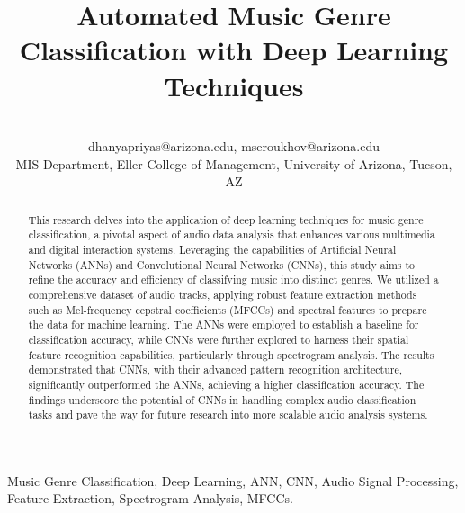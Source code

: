 \documentclass[lettersize,journal]{IEEEtran}
\begin{document}
\title{Automated Music Genre Classification with Deep Learning Techniques}
\author{~\\{\small \hspace{1.0cm} dhanyapriyas@arizona.edu,\hspace{1.5cm}
mseroukhov@arizona.edu}\\MIS Department, Eller College of Management, University of Arizona, Tucson, AZ}
\maketitle
\begin{abstract}
This research delves into the application of deep learning techniques for music genre classification, a pivotal aspect of audio data analysis that enhances various multimedia and digital interaction systems. Leveraging the capabilities of Artificial Neural Networks (ANNs) and Convolutional Neural Networks (CNNs), this study aims to refine the accuracy and efficiency of classifying music into distinct genres. We utilized a comprehensive dataset of audio tracks, applying robust feature extraction methods such as Mel-frequency cepstral coefficients (MFCCs) and spectral features to prepare the data for machine learning. The ANNs were employed to establish a baseline for classification accuracy, while CNNs were further explored to harness their spatial feature recognition capabilities, particularly through spectrogram analysis. The results demonstrated that CNNs, with their advanced pattern recognition architecture, significantly outperformed the ANNs, achieving a higher classification accuracy. The findings underscore the potential of CNNs in handling complex audio classification tasks and pave the way for future research into more scalable audio analysis systems.

\end{abstract}

\begin{IEEEkeywords}
Music Genre Classification, Deep Learning, ANN, CNN, Audio Signal Processing, Feature Extraction, Spectrogram Analysis, MFCCs.
\end{IEEEkeywords}
\end{document}
